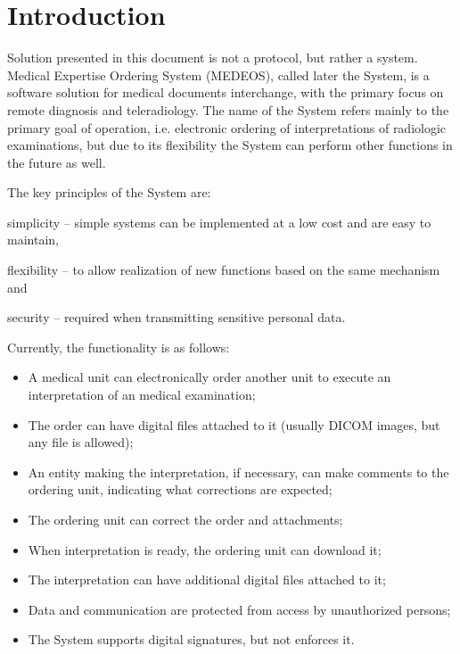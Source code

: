 \documentclass[a4paper]{article}
\begin{document}
\section{Introduction}

Solution presented in this document is not a protocol, but rather a system. Medical
Expertise Ordering System (MEDEOS), called later the System, is a software solution for
medical documents interchange, with the primary focus on remote diagnosis and
teleradiology. The name of the System refers mainly to the primary goal of operation, 
i.e. electronic ordering of interpretations of radiologic examinations, but due to 
its flexibility the System can perform other functions in the future as well.

The key principles of the System are: 
\begin{inparaenum}
\item simplicity -- simple systems can be implemented at a low cost and are easy to
maintain,
\item flexibility -- to allow realization of new functions based on the same mechanism and
\item security -- required when transmitting sensitive personal data.
\end{inparaenum}

Currently, the functionality is as follows:
\begin{itemize}
  \item A medical unit can electronically order another unit to execute an interpretation of
  an medical examination;
  \item The order can have digital files attached to it (usually DICOM images, but any
  file is allowed);
  \item An entity making the interpretation, if necessary, can make comments to the ordering
  unit, indicating what corrections are expected;
  \item The ordering unit can correct the order and attachments;
  \item When interpretation is ready, the ordering unit can download it;
  \item The interpretation can have additional digital files attached to it;
  \item Data and communication are protected from access by unauthorized persons;
  \item The System supports digital signatures, but not enforces it.
\end{itemize}
\end{document}
